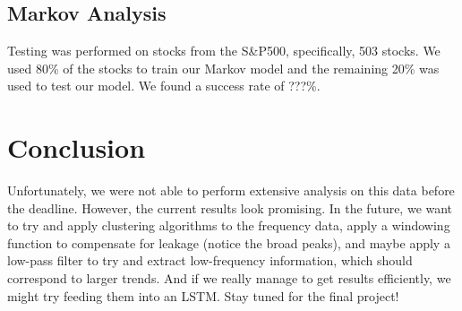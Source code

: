\documentclass[final]{article}
\begin{document}













\subsection{Markov Analysis}

Testing was performed on stocks from the S&P500, specifically, 503 stocks. We
used 80\% of the stocks to train our Markov model and the remaining 20\% was
used to test our model. We found a success rate of ???\%.

\section{Conclusion}

Unfortunately, we were not able to perform extensive analysis on this
data before the deadline. However, the current results look promising.
In the future, we want to try and apply clustering algorithms to the
frequency data, apply a windowing function to compensate for leakage
(notice the broad peaks), and maybe apply a low-pass filter to try and
extract low-frequency information, which should correspond to larger
trends. And if we really manage to get results efficiently, we might
try feeding them into an LSTM. Stay tuned for the final project!
\end{document}
